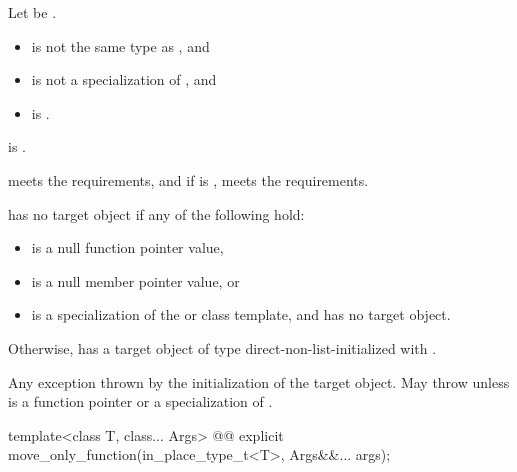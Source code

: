 \begin{itemdescr}
\pnum
Let  be .

\pnum
\constraints
\begin{itemize}
\item {} is not the same type as , and
\item {} is not a specialization of , and
\item {} is .
\end{itemize}

\pnum
\mandates
{} is .

\pnum
\expects
{} meets the  requirements, and if  is ,  meets the  requirements.

\pnum
\ensures
{} has no target object if any of the following hold:
\begin{itemize}
\item {} is a null function pointer value,
\item {} is a null member pointer value, or
\item {} is a specialization of the  or  class template, and  has no target object.
\end{itemize}
Otherwise,  has a target object of type  direct-non-list-initialized with .

\pnum
\throws
Any exception thrown by the initialization of the target object. May throw  unless  is a function pointer or a specialization of .
\end{itemdescr}

%
\begin{itemdecl}
template<class T, class... Args>
  @@ explicit move_only_function(in_place_type_t<T>, Args&&... args);
\end{itemdecl}

